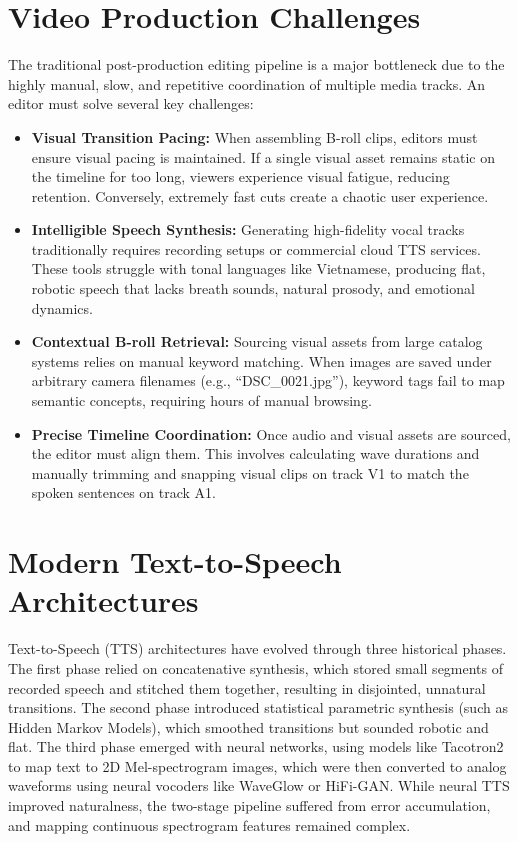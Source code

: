 \documentclass[a4paper,12pt]{report}
\begin{document}
\section{Video Production Challenges}
The traditional post-production editing pipeline is a major bottleneck due to the highly manual, slow, and repetitive coordination of multiple media tracks. An editor must solve several key challenges:
\begin{itemize}
    \item \textbf{Visual Transition Pacing:} When assembling B-roll clips, editors must ensure visual pacing is maintained. If a single visual asset remains static on the timeline for too long, viewers experience visual fatigue, reducing retention. Conversely, extremely fast cuts create a chaotic user experience.
    \item \textbf{Intelligible Speech Synthesis:} Generating high-fidelity vocal tracks traditionally requires recording setups or commercial cloud TTS services. These tools struggle with tonal languages like Vietnamese, producing flat, robotic speech that lacks breath sounds, natural prosody, and emotional dynamics.
    \item \textbf{Contextual B-roll Retrieval:} Sourcing visual assets from large catalog systems relies on manual keyword matching. When images are saved under arbitrary camera filenames (e.g., ``DSC\_0021.jpg''), keyword tags fail to map semantic concepts, requiring hours of manual browsing.
    \item \textbf{Precise Timeline Coordination:} Once audio and visual assets are sourced, the editor must align them. This involves calculating wave durations and manually trimming and snapping visual clips on track V1 to match the spoken sentences on track A1.
\end{itemize}

\section{Modern Text-to-Speech Architectures}
Text-to-Speech (TTS) architectures have evolved through three historical phases. The first phase relied on concatenative synthesis, which stored small segments of recorded speech and stitched them together, resulting in disjointed, unnatural transitions. The second phase introduced statistical parametric synthesis (such as Hidden Markov Models), which smoothed transitions but sounded robotic and flat. The third phase emerged with neural networks, using models like Tacotron2 to map text to 2D Mel-spectrogram images, which were then converted to analog waveforms using neural vocoders like WaveGlow or HiFi-GAN. While neural TTS improved naturalness, the two-stage pipeline suffered from error accumulation, and mapping continuous spectrogram features remained complex.
\end{document}
